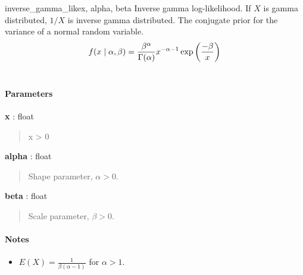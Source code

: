 \hypertarget{pymc.distributions.inverse_gamma_like}{}
\begin{funcdesc}{inverse\_gamma\_like}{x, alpha, beta}
Inverse gamma log-likelihood. If $X$ is gamma distributed, $1/X$ is inverse gamma distributed.
The conjugate prior for the variance of a normal random variable.
\begin{gather}
\begin{split}f(x \mid \alpha, \beta) = \frac{\beta^{\alpha}}{\Gamma(\alpha)} x^{-\alpha - 1} \exp\left(\frac{-\beta}{x}\right)\end{split}\notag\\\begin{split}\end{split}\notag
\end{gather}
\paragraph{Parameters}
\begin{paramlist}
\item[] \textbf{x} : float
\begin{quote}

x \textgreater{} 0
\end{quote}

\item[] \textbf{alpha} : float
\begin{quote}

Shape parameter, $\alpha > 0$.
\end{quote}

\item[] \textbf{beta} : float
\begin{quote}

Scale parameter, $\beta > 0$.
\end{quote}
\end{paramlist}
\paragraph{Notes}
\begin{itemize}
\item $E(X)=\frac{1}{\beta(\alpha-1)}$  for $\alpha > 1$.
\end{itemize}
\end{funcdesc}


